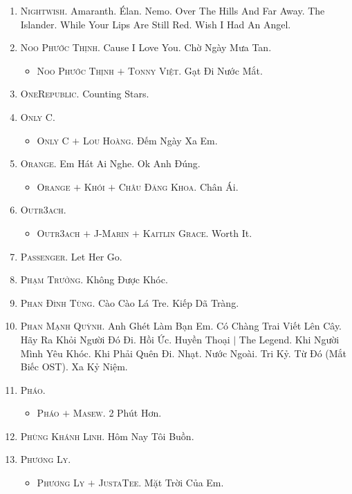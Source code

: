 \documentclass[oneside]{book}
\numberwithin{equation}{section}
\begin{document}
\begin{enumerate}
	\item \textsc{Nightwish.} Amaranth. \'Elan. Nemo. Over The Hills And Far Away. The Islander. While Your Lips Are Still Red. Wish I Had An Angel.
	\item \textsc{Noo Phước Thịnh.} Cause I Love You. Chờ Ngày Mưa Tan.
	\begin{itemize}
		\item \textsc{Noo Phước Thịnh $+$ Tonny Việt.} Gạt Đi Nước Mắt.
	\end{itemize}
	\item \textsc{OneRepublic.} Counting Stars.
	\item \textsc{Only C.}
	\begin{itemize}
		\item \textsc{Only C $+$ Lou Hoàng.} Đếm Ngày Xa Em.
	\end{itemize}
	\item \textsc{Orange.} Em Hát Ai Nghe. Ok Anh Đúng.
	\begin{itemize}
		\item \textsc{Orange $+$ Khói $+$ Châu Đăng Khoa.} Chân Ái.
	\end{itemize}
	\item \textsc{Outr3ach.}
	\begin{itemize}
		\item \textsc{Outr3ach $+$ J-Marin $+$ Kaitlin Grace.} Worth It.
	\end{itemize}
	\item \textsc{Passenger.} Let Her Go.
	\item \textsc{Phạm Trưởng.} Không Được Khóc.
	\item \textsc{Phan Đình Tùng.} Cào Cào Lá Tre. Kiếp Dã Tràng.
	\item \textsc{Phan Mạnh Quỳnh.} Anh Ghét Làm Bạn Em. Có Chàng Trai Viết Lên Cây. Hãy Ra Khỏi Người Đó Đi. Hồi Ức. Huyền Thoại $|$ The Legend. Khi Người Mình Yêu Khóc. Khi Phải Quên Đi. Nhạt. Nước Ngoài. Tri Kỷ. Từ Đó (Mắt Biếc OST). Xa Kỷ Niệm.
	\item \textsc{Pháo.}
	\begin{itemize}
		\item \textsc{Pháo $+$ Masew.} 2 Phút Hơn.
	\end{itemize}
	\item \textsc{Phùng Khánh Linh.} Hôm Nay Tôi Buồn.
	\item \textsc{Phương Ly.}
	\begin{itemize}
		\item \textsc{Phương Ly $+$ JustaTee.} Mặt Trời Của Em.
	\end{itemize}

\end{enumerate}
\end{document}
